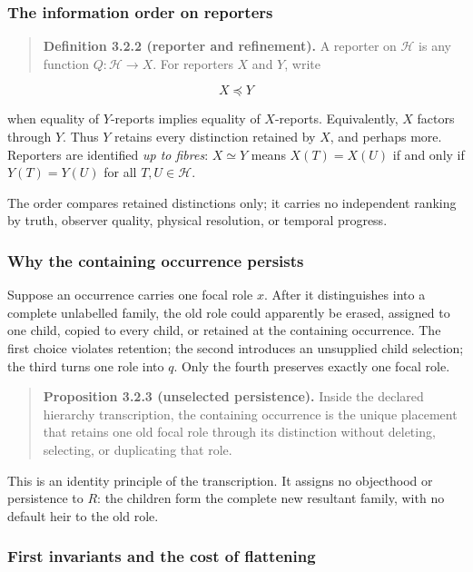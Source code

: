 \documentclass[11pt,a4paper]{article}
\begin{document}
\subsubsection{The information order on
reporters}

\begin{quote}
\textbf{Definition 3.2.2 (reporter and refinement).} A reporter on
\(\mathcal{H}\) is any function \(Q:\mathcal{H} \rightarrow X\). For
reporters \(X\) and \(Y\), write
\end{quote}

\[X \preccurlyeq Y\]

when equality of \(Y\)-reports implies equality of \(X\)-reports.
Equivalently, \(X\) factors through \(Y\). Thus \(Y\) retains every
distinction retained by \(X\), and perhaps more. Reporters are
identified \emph{up to fibres}: \(X \simeq Y\) means \(X(T) = X(U)\) if
and only if \(Y(T) = Y(U)\) for all \(T,U \in \mathcal{H}\).

The order compares retained distinctions only; it carries no independent
ranking by truth, observer quality, physical resolution, or temporal
progress.

\subsubsection{Why the containing occurrence
persists}

Suppose an occurrence carries one focal role \(x\). After it
distinguishes into a complete unlabelled family, the old role could
apparently be erased, assigned to one child, copied to every child, or
retained at the containing occurrence. The first choice violates
retention; the second introduces an unsupplied child selection; the
third turns one role into \(q\). Only the fourth preserves exactly one
focal role.

\begin{quote}
\textbf{Proposition 3.2.3 (unselected persistence).} Inside the declared
hierarchy transcription, the containing occurrence is the unique
placement that retains one old focal role through its distinction
without deleting, selecting, or duplicating that role.
\end{quote}

This is an identity principle of the transcription. It assigns no
objecthood or persistence to \(R\): the children form the complete new
resultant family, with no default heir to the old role.

\subsubsection{First invariants and the cost of
flattening}
\end{document}
